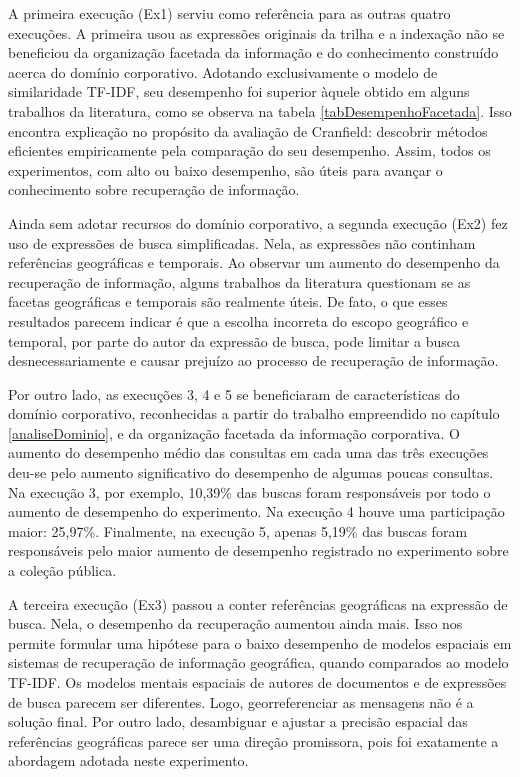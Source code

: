 


A primeira execução (Ex1) serviu como referência para as outras quatro execuções. A primeira usou as expressões originais da trilha e a indexação não se beneficiou da organização facetada da informação e do conhecimento construído acerca do domínio corporativo. Adotando exclusivamente o modelo de similaridade TF-IDF, seu desempenho foi superior àquele obtido em alguns trabalhos da literatura, como se observa na tabela \ref{tabDesempenhoFacetada}. Isso encontra explicação no propósito da avaliação de Cranfield: descobrir métodos eficientes empiricamente pela comparação do seu desempenho. Assim, todos os experimentos, com alto ou baixo desempenho, são úteis para avançar o conhecimento sobre recuperação de informação.

Ainda sem adotar recursos do domínio corporativo, a segunda execução (Ex2) fez uso de expressões de busca simplificadas. Nela, as expressões não continham referências geográficas e temporais. Ao observar um aumento do desempenho da recuperação de informação, alguns trabalhos da literatura questionam se as facetas geográficas e temporais são realmente úteis. De fato, o que esses resultados parecem indicar é que a escolha incorreta do escopo geográfico e temporal, por parte do autor da expressão de busca, pode limitar a busca desnecessariamente e causar prejuízo ao processo de recuperação de informação.

Por outro lado, as execuções 3, 4 e 5 se beneficiaram de características do domínio corporativo, reconhecidas a partir do trabalho empreendido no capítulo \ref{analiseDominio}, e da organização facetada da informação corporativa. O aumento do desempenho médio das consultas em cada uma das três execuções deu-se pelo aumento significativo do desempenho de algumas poucas consultas. Na execução 3, por exemplo, 10,39\% das buscas foram responsáveis por todo o aumento de desempenho do experimento. Na execução 4 houve uma participação maior: 25,97\%. Finalmente, na execução 5, apenas 5,19\% das buscas foram responsáveis pelo maior aumento de desempenho registrado no experimento sobre a coleção pública.

A terceira execução (Ex3) passou a conter referências geográficas na expressão de busca. Nela, o desempenho da recuperação aumentou ainda mais. Isso nos permite formular uma hipótese para o baixo desempenho de modelos espaciais em sistemas de recuperação de informação geográfica, quando comparados ao modelo TF-IDF. Os modelos mentais espaciais de autores de documentos e de expressões de busca parecem ser diferentes. Logo, georreferenciar as mensagens não é a solução final. Por outro lado, desambiguar e ajustar a precisão espacial das referências geográficas parece ser uma direção promissora, pois foi exatamente a abordagem adotada neste experimento.

